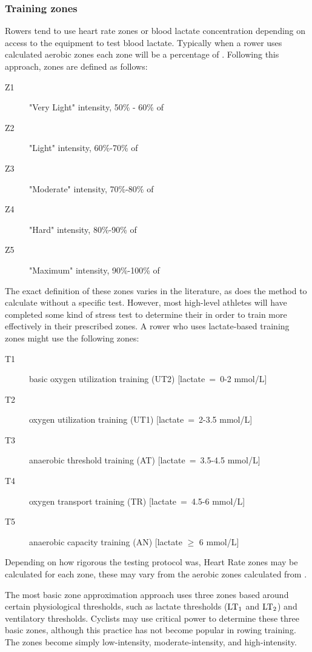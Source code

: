 \subsubsection{Training zones}
Rowers tend to use heart rate zones or blood lactate concentration depending on access to the equipment to test blood lactate. Typically when a rower uses calculated aerobic zones each zone will be a percentage of \maxHR. Following this approach, zones are defined as follows:
\begin{description}
  \item[Z1] "Very Light" intensity, 50\% - 60\% of \maxHR
  \item[Z2] "Light" intensity, 60\%-70\% of \maxHR
  \item[Z3] "Moderate" intensity, 70\%-80\% of \maxHR
  \item[Z4] "Hard" intensity, 80\%-90\% of \maxHR
  \item[Z5] "Maximum" intensity, 90\%-100\% of \maxHR
\end{description}
The exact definition of these zones varies in the literature, as does the method to calculate \maxHR without a specific test. However, most high-level athletes will have completed some kind of stress test to determine their \maxHR in order to train more effectively in their prescribed zones.
A rower who uses lactate-based training zones might use the following zones:
\begin{description}
  \item[T1]  basic oxygen utilization training (UT2) [lactate~=~0-2 mmol/L]
  \item[T2]  oxygen utilization training (UT1) [lactate~=~2-3.5 mmol/L]
  \item[T3]  anaerobic threshold training (AT) [lactate~=~3.5-4.5 mmol/L]
  \item[T4]  oxygen transport training (TR) [lactate~=~4.5-6 mmol/L]
  \item[T5]  anaerobic capacity training (AN) [lactate $\geq$ 6 mmol/L] \autocite{Das2022}
\end{description}
Depending on how rigorous the testing protocol was, Heart Rate zones may be calculated for each zone, these may vary from the aerobic zones calculated from \maxHR.

The most basic zone approximation approach uses three zones based around certain physiological thresholds, such as lactate thresholds ($\textnormal{LT}_\text{1}$ and $\textnormal{LT}_\text{2}$) and ventilatory thresholds. Cyclists may use critical power to determine these three basic zones, although this practice has not become popular in rowing training. The zones become simply low-intensity, moderate-intensity, and high-intensity. 

